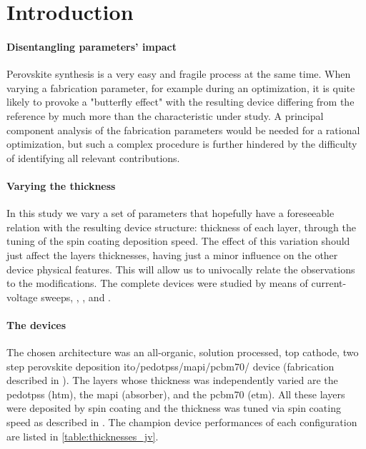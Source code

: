 

\section{Introduction}

	\paragraph{Disentangling parameters' impact}
	Perovskite synthesis is a very easy and fragile process at the same time. When varying a fabrication parameter, for example during an optimization, it is quite likely to provoke a "butterfly effect" with the resulting device differing from the reference by much more than the characteristic under study.
	A principal component analysis of the fabrication parameters would be needed for a rational optimization, but such a complex procedure is further hindered by the difficulty of identifying all relevant contributions.

	\paragraph{Varying the thickness}
	In this study we vary a set of parameters that hopefully have a foreseeable relation with the resulting device structure: thickness of each layer, through the tuning of the spin coating deposition speed.
	The effect of this variation should just affect the layers thicknesses, having just a minor influence on the other device physical features.
	This will allow us to univocally relate the observations to the modifications.
	The complete devices were studied by means of current-voltage sweeps, , , and .

	\paragraph{The devices}
	The chosen architecture was an all-organic, solution processed, top cathode, two step perovskite deposition \gls{ito}\-/\gls{pedotpss}\-/\gls{mapi}\-/\gls{pcbm70}\-/ device (fabrication described in ).
	The layers whose thickness was independently varied are the \gls{pedotpss} (\gls{htm}), the \gls{mapi} (absorber), and the \gls{pcbm70} (\gls{etm}).
All these layers were deposited by spin coating and the thickness was tuned via spin coating speed as described in .
The champion device performances of each configuration are listed in \cref{table:thicknesses_jv}.


